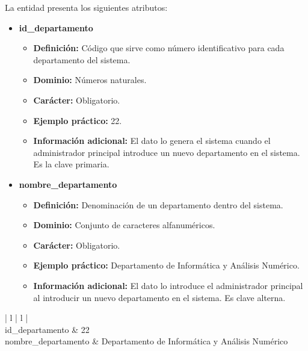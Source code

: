 \begin{description}
   \item[Descripción de los atributos] La entidad presenta los siguientes
   atributos:

   \begin{itemize}
    \item \textbf{id\_departamento}
      \begin{itemize}
         \item \textbf{Definición:} Código que sirve como número identificativo
               para cada departamento del sistema.
         \item \textbf{Dominio:} Números naturales.
         \item \textbf{Carácter:} Obligatorio.
         \item \textbf{Ejemplo práctico:} 22.
         \item \textbf{Información adicional:} El dato lo genera el sistema
               cuando el administrador principal introduce un nuevo departamento
               en el sistema. Es la clave primaria.
      \end{itemize}
   \item \textbf{nombre\_departamento}
      \begin{itemize}
         \item \textbf{Definición:} Denominación de un departamento dentro del sistema.
         \item \textbf{Dominio:} Conjunto de caracteres alfanuméricos.
         \item \textbf{Carácter:} Obligatorio.
         \item \textbf{Ejemplo práctico:} Departamento de Informática y Análisis Numérico.
         \item \textbf{Información adicional:} El dato lo introduce el
         administrador principal al introducir un nuevo departamento en el sistema. Es
         clave alterna.
      \end{itemize}
   \end{itemize}

   \item[Ejemplo práctico]

   \item \begin{center}
            \begin{tabular}{ | l | l | }
            \hline
             \\
            \hline
            id\_departamento & 22 \\
            \hline
            nombre\_departamento & Departamento de Informática y Análisis Numérico \\
            \hline
            \end{tabular}
         \end{center}
   \end{description}
